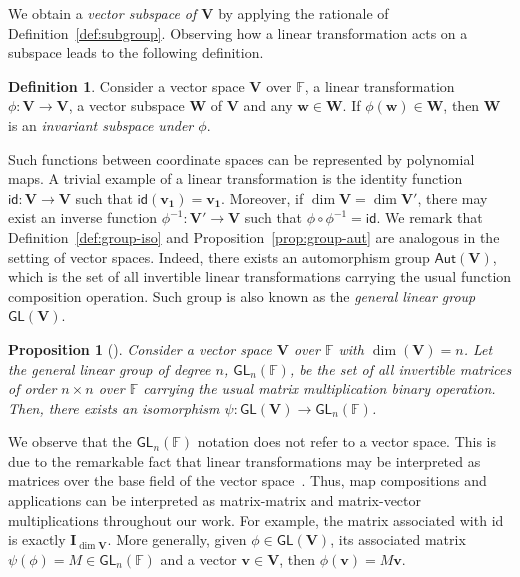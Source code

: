 \documentclass[english]{ufsc-thesis-rn46-2019/ufsc-thesis-rn46-2019}
\newtheorem{proposition}[theorem]{Proposition}
\theoremstyle{definition}
\newtheorem{definition}[theorem]{Definition}
\begin{document}
We obtain a \emph{vector subspace of $\mathbf{V}$} by applying the rationale of
Definition~\ref{def:subgroup}. Observing how a linear transformation acts on
a subspace leads to the following definition.

\begin{definition}
  Consider a vector space $\mathbf{V}$ over $\mathbb{F}$, a linear
  transformation $\phi : \mathbf{V} \to \mathbf{V}$, a vector subspace
  $\mathbf{W}$ of $\mathbf{V}$ and any $\mathbf{w} \in \mathbf{W}$. If
  $\phi(\mathbf{w}) \in \mathbf{W}$, then $\mathbf{W}$ is an \emph{invariant
  subspace under $\phi$}.
\end{definition}

Such functions between coordinate spaces can be represented by polynomial
maps. A trivial example of a linear transformation is the identity function
$\mathsf{id} : \mathbf{V} \to \mathbf{V}$ such that
$\mathsf{id}(\mathbf{v_{1}}) = \mathbf{v_{1}}$. Moreover, if
$\dim \mathbf{V} = \dim \mathbf{V'}$, there may exist an inverse function
$\phi^{-1} : \mathbf{V'} \to \mathbf{V}$ such that
$\phi \circ \phi^{-1} = \mathsf{id}$. We remark that
Definition~\ref{def:group-iso} and Proposition~\ref{prop:group-aut} are
analogous in the setting of vector spaces. Indeed, there exists an automorphism
group $\mathsf{Aut}(\mathbf{V})$, which is the set of all invertible linear
transformations carrying the usual function composition operation. Such group
is also known as the \emph{general linear group} $\mathsf{GL}(\mathbf{V})$.

\begin{proposition}[{\cite[p.~418, Cor.~14]{Dummit:2003}}]
  Consider a vector space $\mathbf{V}$ over $\mathbb{F}$ with
  $\dim(\mathbf{V}) = n$. Let the \emph{general linear group of degree $n$,
  $\mathsf{GL}_{n}(\mathbb{F})$}, be the set of all invertible matrices of
  order $n \times n$ over $\mathbb{F}$ carrying the usual matrix multiplication
  binary operation. Then, there exists an isomorphism
  $\psi : \mathsf{GL}(\mathbf{V}) \to \mathsf{GL}_{n}(\mathbb{F})$.
\end{proposition}

We observe that the $\mathsf{GL}_{n}(\mathbb{F})$ notation does not refer to
a vector space. This is due to the remarkable fact that linear transformations
may be interpreted as matrices over the base field of the vector
space~\cite[Sec.~11.2]{Dummit:2003}. Thus, map compositions and applications
can be interpreted as matrix-matrix and matrix-vector multiplications
throughout our work. For example, the matrix associated with \textsf{id} is
exactly $\mathbf{I}_{\dim \mathbf{V}}$. More generally, given
$\phi \in \mathsf{GL}(\mathbf{V})$, its associated matrix
$\psi(\phi) = M \in \mathsf{GL}_{n}(\mathbb{F})$ and a vector
$\mathbf{v} \in \mathbf{V}$, then $\phi(\mathbf{v}) = M\mathbf{v}$.
\end{document}
